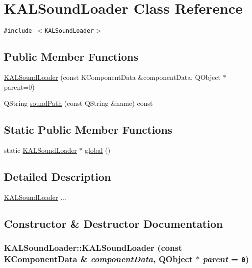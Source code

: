 \hypertarget{class_k_a_l_sound_loader}{
\section{KALSoundLoader Class Reference}
\label{class_k_a_l_sound_loader}
}
{\tt \#include $<$KALSoundLoader$>$}

\subsection*{Public Member Functions}
\begin{CompactItemize}
\item 
\hyperlink{class_k_a_l_sound_loader_b66e13296945b152d9ec057763733ac9}{KALSoundLoader} (const KComponentData \&componentData, QObject $\ast$parent=0)
\item 
QString \hyperlink{class_k_a_l_sound_loader_7224c83e67c68b8dd4bc485ab5d697cd}{soundPath} (const QString \&name) const 
\end{CompactItemize}
\subsection*{Static Public Member Functions}
\begin{CompactItemize}
\item 
static \hyperlink{class_k_a_l_sound_loader}{KALSoundLoader} $\ast$ \hyperlink{class_k_a_l_sound_loader_369cbbc9830906fdf401a2ad333bae3a}{global} ()
\end{CompactItemize}


\subsection{Detailed Description}
\hyperlink{class_k_a_l_sound_loader}{KALSoundLoader} ... 

\subsection{Constructor \& Destructor Documentation}
\hypertarget{class_k_a_l_sound_loader_b66e13296945b152d9ec057763733ac9}{
\subsubsection[{KALSoundLoader}]{\setlength{\rightskip}{0pt plus 5cm}KALSoundLoader::KALSoundLoader (const KComponentData \& {\em componentData}, \/  QObject $\ast$ {\em parent} = {\tt 0})}}
\label{class_k_a_l_sound_loader_b66e13296945b152d9ec057763733ac9}


